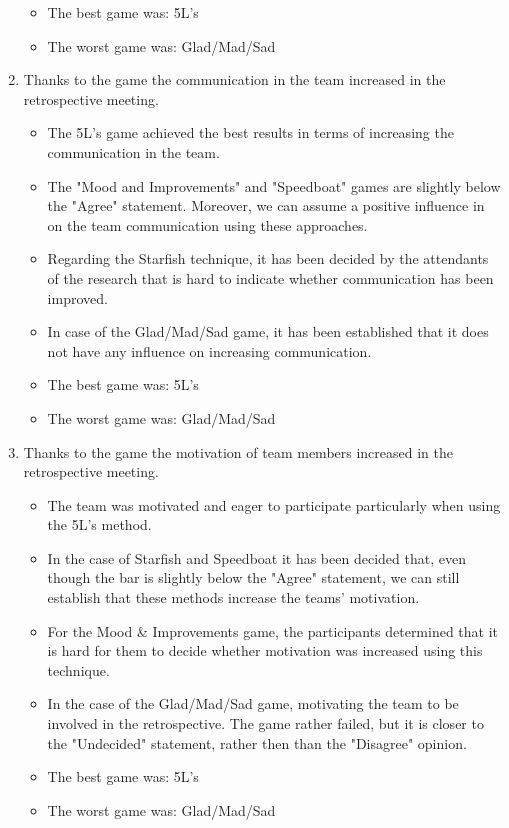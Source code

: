 \begin{enumerate}
\begin{itemize}
        \item The best game was: 5L's
        \item The worst game was: Glad/Mad/Sad
    \end{itemize}
    \item Thanks to the game the communication in the team increased in the retrospective meeting.
    \begin{itemize}
        \item The 5L’s game achieved the best results in terms of increasing the communication in the team. 
        \item The "Mood and Improvements" and "Speedboat" games are slightly below the "Agree" statement. Moreover, we can assume a positive influence in on the team communication using these approaches.
        \item Regarding the Starfish technique, it has been decided by the attendants of the research that is hard to indicate whether communication has been improved. 
        \item In case of the Glad/Mad/Sad game, it has been established that it does not have any influence on increasing communication. 
        \item The best game was: 5L's
        \item The worst game was: Glad/Mad/Sad
    \end{itemize}
    \item Thanks to the game the motivation of team members increased in the retrospective meeting.
    \begin{itemize}
        \item The team was motivated and eager to participate particularly when using the 5L’s method. 
        \item In the case of Starfish and Speedboat it has been decided that, even though the bar is slightly below the "Agree" statement, we can still establish that these methods increase the teams' motivation. 
        \item For the Mood \& Improvements game, the participants determined that it is hard for them to decide whether motivation was increased using this technique.
        \item In the case of the Glad/Mad/Sad game, motivating the team to be involved in the retrospective. The game rather failed, but it is closer to the "Undecided" statement, rather then than the "Disagree" opinion.
        \item The best game was: 5L's
        \item The worst game was: Glad/Mad/Sad

\end{itemize}
\end{enumerate}
